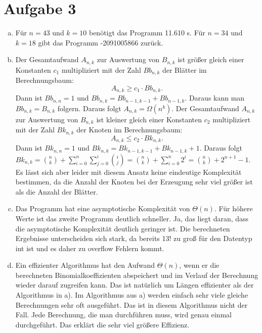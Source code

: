 \documentclass{article}
\begin{document}
\section*{Aufgabe 3}
\begin{enumerate}[a)]
	\item 
	Für $n= 43$ und $k=10$ benötigt das Programm 11.610 s. Für $n= 34$ und $k=18$ gibt das Programm -2091005866 zurück.
	
	\item Der Gesamtaufwand $A_{n,k}$ zur Auswertung von $B_{n,k}$ ist größer gleich einer Konstanten $c_1$ multipliziert mit der Zahl $Bb_{n, k}$ der Blätter im Berechnungsbaum:
	\[A_{n,k} \geq c_1 \cdot Bb_{n,k}.\]
	Dann ist $Bb_{n,n} = 1$ und $Bb_{n,k} = Bb_{n-1,k-1} + Bb_{n-1, k}$. Daraus kann man $Bb_{n,k} = B_{n,k}$ folgern. Daraus folgt $A_{n,k} = \Omega(n^k)$.
	Der Gesamtaufwand $A_{n,k}$ zur Auswertung von $B_{n,k}$ ist kleiner gleich einer Konstanten $c_2$ multipliziert mit der Zahl $Bk_{n, k}$ der Knoten im Berechnungsbaum:
	\[A_{n,k} \leq c_2 \cdot Bk_{n,k}.\]
	Dann ist $Bk_{n,n} = 1$ und $Bk_{n,k} = Bk_{n-1,k-1} + Bk_{n-1, k} + 1$. Daraus folgt $Bk_{n,k}= \binom{n}{k} + \sum_{i=0}^{n} \sum_{j=0}^{i} \binom{i}{j} = \binom{n}{k} + \sum_{i=0}^{n} 2^i = \binom{n}{k} + 2^{n+1}-1$.\\
	Es lässt sich aber leider mit diesem Ansatz keine eindeutige Komplexität bestimmen, da die Anzahl der Knoten bei der Erzeugung sehr viel größer ist als die Anzahl der Blätter.
	\newpage
	\item Das Programm hat eine asymptotische Komplexität von $\Theta(n)$.
	Für höhere Werte ist das zweite Programm deutlich schneller. Ja, das liegt daran, dass die asymptotische Komplexität deutlich geringer ist.
	Die berechneten Ergebnisse unterscheiden sich stark, da bereits 13! zu groß für den Datentyp int ist und es daher zu overflow Fehlern kommt.
	
	\item Ein effizienter Algorithmus hat den Aufwand $\Theta(n)$, wenn er die berechneten Binomialkoeffizienten abspeichert und im Verlauf der Berechnung wieder darauf zugreifen kann. Das ist natürlich um Längen effizienter als der Algorithmus in a). Im Algorithmus aus a) werden einfach sehr viele gleiche Berechnungen sehr oft ausgeführt.
	Das ist in diesem Algorithmus nicht der Fall. Jede Berechnung, die man durchführen muss, wird genau einmal durchgeführt. Das erklärt die sehr viel größere Effizienz.
\end{enumerate}
\end{document}
